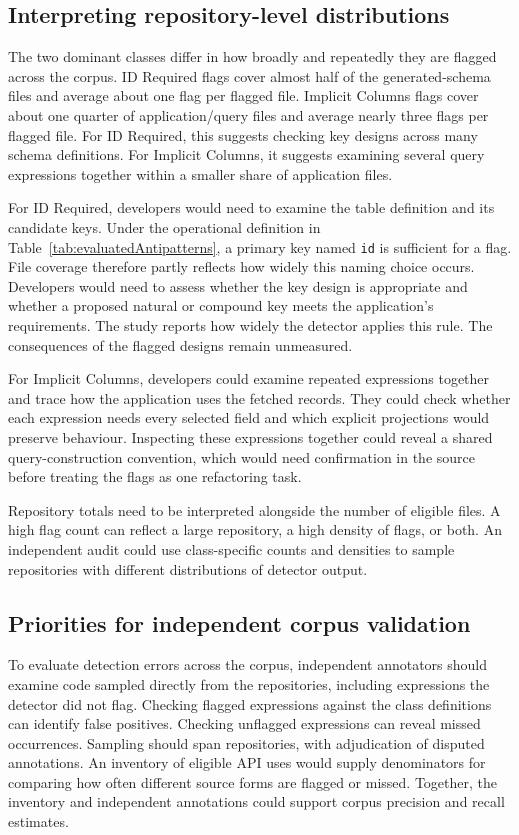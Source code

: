 \subsection{Interpreting repository-level distributions}

The two dominant classes differ in how broadly and repeatedly they are flagged across the corpus. ID Required flags cover almost half of the generated-schema files and average about one flag per flagged file. Implicit Columns flags cover about one quarter of application/query files and average nearly three flags per flagged file. For ID Required, this suggests checking key designs across many schema definitions. For Implicit Columns, it suggests examining several query expressions together within a smaller share of application files.

For ID Required, developers would need to examine the table definition and its candidate keys. Under the operational definition in Table~\ref{tab:evaluatedAntipatterns}, a primary key named \texttt{id} is sufficient for a flag. File coverage therefore partly reflects how widely this naming choice occurs. Developers would need to assess whether the key design is appropriate and whether a proposed natural or compound key meets the application's requirements. The study reports how widely the detector applies this rule. The consequences of the flagged designs remain unmeasured.

For Implicit Columns, developers could examine repeated expressions together and trace how the application uses the fetched records. They could check whether each expression needs every selected field and which explicit projections would preserve behaviour. Inspecting these expressions together could reveal a shared query-construction convention, which would need confirmation in the source before treating the flags as one refactoring task.

Repository totals need to be interpreted alongside the number of eligible files. A high flag count can reflect a large repository, a high density of flags, or both. An independent audit could use class-specific counts and densities to sample repositories with different distributions of detector output.

\subsection{Priorities for independent corpus validation}

To evaluate detection errors across the corpus, independent annotators should examine code sampled directly from the repositories, including expressions the detector did not flag. Checking flagged expressions against the class definitions can identify false positives. Checking unflagged expressions can reveal missed occurrences. Sampling should span repositories, with adjudication of disputed annotations. An inventory of eligible API uses would supply denominators for comparing how often different source forms are flagged or missed. Together, the inventory and independent annotations could support corpus precision and recall estimates.

